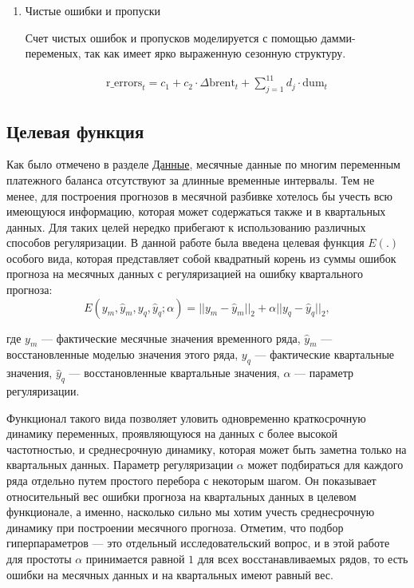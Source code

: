 \documentclass[a4paper, 14pt]{extarticle}
\newcommand{\lsum}{\sum\limits}
\begin{document}
\begin{enumerate}
		\newpage
		\item Чистые ошибки и пропуски
		
		Счет чистых ошибок и пропусков моделируется с помощью дамми-переменых, так как имеет ярко выраженную сезонную структуру.
		
		\begin{align*}
		\text{r\_errors}_t = c_1 + c_2\cdot \Delta \text{brent}_t  + \lsum_{j = 1}^{11} d_j \cdot \text{dum}_t
		\end{align*}
\end{enumerate}

\subsection{Целевая функция}\label{sub:costfunction}

Как было отмечено в разделе \hyperref[sub:data]{Данные}, месячные данные по многим переменным платежного баланса отсутствуют за длинные временные интервалы.
Тем не менее, для построения прогнозов в месячной разбивке хотелось бы учесть всю имеющуюся информацию, которая может содержаться также и в квартальных данных. 
Для таких целей нередко прибегают к использованию различных способов регуляризации.
В данной работе была введена целевая функция $E(.)$ особого вида, которая представляет собой квадратный корень из суммы ошибок прогноза на месячных данных с регуляризацией на ошибку квартального прогноза:
\[
E(y_m, \hat y_m, y_q, \hat y_q; \alpha) = || y_m - \hat y_m ||_2 + \alpha|| y_q - \hat y_q ||_2,
\]

где $y_m$ — фактические месячные значения временного ряда, $\hat y_m$ — восстановленные моделью значения этого ряда, $y_q$ — фактические квартальные значения, $\hat y_q$ — восстановленные квартальные значения, $\alpha$ — параметр регуляризации.

Функционал такого вида позволяет уловить одновременно краткосрочную динамику переменных, проявляющуюся на данных с более высокой частотностью, и среднесрочную динамику, которая может быть заметна только на квартальных данных.
Параметр регуляризации $\alpha$ может подбираться для каждого ряда отдельно путем простого перебора с некоторым шагом. 
Он показывает относительный вес ошибки прогноза на квартальных данных в целевом функционале, а именно, насколько сильно мы хотим учесть среднесрочную динамику при построении месячного прогноза.
Отметим, что подбор гиперпараметров — это отдельный исследовательский вопрос, и в этой работе для простоты  $\alpha$ принимается равной $1$ для всех восстанавливаемых рядов, то есть ошибки на месячных данных и на квартальных имеют равный вес.
\end{document}
